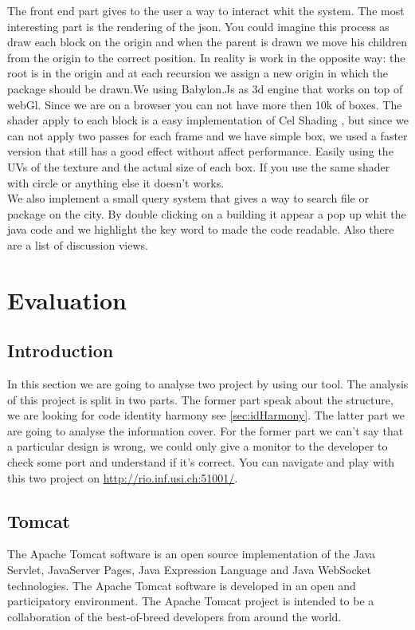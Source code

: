 \documentclass[]{usiinfbachelorproject}
\begin{document}
The front end part gives to the user a way to interact whit the system. The most interesting part is the rendering of the json. You could imagine this process as draw each block on the origin and when the parent is drawn we move his children from the origin to the correct position. In reality is work in the opposite way: the root is in the origin and at each recursion we assign a new origin in which the package should be drawn.We using Babylon.Js as 3d engine that works on top of webGl. Since we are on a browser you can not have more then 10k of boxes. The shader apply to each block is a easy implementation  of Cel Shading , but since we can not apply two passes for each frame and we have simple box, we used a faster version that still has a good effect without affect performance. Easily using the UVs of the texture and the actual size of each box. If you use the same shader with circle or anything else it doesn't works.\\

We also implement a small query system that gives a way to search file or package on the city. By double clicking on a building it appear a pop up whit the java code and we highlight the key word to made the code readable. Also there are a list of discussion views.\\ 



   





\newpage
\section{Evaluation} \label{evaluation}

\subsection{Introduction}
In this section we are going to analyse two project by using our tool. 
The analysis of this project is split in two parts. The former part speak about the structure, we are looking  for code identity harmony see \ref{sec:idHarmony}. The latter part we are going to analyse the information cover. 
For the former part we can't say that a particular design is wrong, we could only give a monitor to the developer to check some port and understand if it's correct.
You can navigate and play with this two project on \url{http://rio.inf.usi.ch:51001/}. 

\subsection{Tomcat}
The Apache Tomcat software is an open source implementation of the Java Servlet, JavaServer Pages, Java Expression Language and Java WebSocket technologies. 
The Apache Tomcat software is developed in an open and participatory environment. The Apache Tomcat project is intended to be a collaboration of the best-of-breed developers from around the world.
\end{document}
